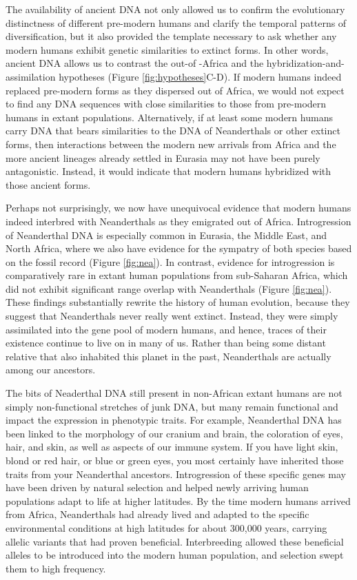 \documentclass[
]{book}
\begin{document}
The availability of ancient DNA not only allowed us to confirm the evolutionary distinctness of different pre-modern humans and clarify the temporal patterns of diversification, but it also provided the template necessary to ask whether any modern humans exhibit genetic similarities to extinct forms. In other words, ancient DNA allows us to contrast the out-of -Africa and the hybridization-and-assimilation hypotheses (Figure \ref{fig:hypotheses}C-D). If modern humans indeed replaced pre-modern forms as they dispersed out of Africa, we would not expect to find any DNA sequences with close similarities to those from pre-modern humans in extant populations. Alternatively, if at least some modern humans carry DNA that bears similarities to the DNA of Neanderthals or other extinct forms, then interactions between the modern new arrivals from Africa and the more ancient lineages already settled in Eurasia may not have been purely antagonistic. Instead, it would indicate that modern humans hybridized with those ancient forms.

Perhaps not surprisingly, we now have unequivocal evidence that modern humans indeed interbred with Neanderthals as they emigrated out of Africa. Introgression of Neanderthal DNA is especially common in Eurasia, the Middle East, and North Africa, where we also have evidence for the sympatry of both species based on the fossil record (Figure \ref{fig:nea}). In contrast, evidence for introgression is comparatively rare in extant human populations from sub-Saharan Africa, which did not exhibit significant range overlap with Neanderthals (Figure \ref{fig:nea}). These findings substantially rewrite the history of human evolution, because they suggest that Neanderthals never really went extinct. Instead, they were simply assimilated into the gene pool of modern humans, and hence, traces of their existence continue to live on in many of us. Rather than being some distant relative that also inhabited this planet in the past, Neanderthals are actually among our ancestors.

The bits of Neaderthal DNA still present in non-African extant humans are not simply non-functional stretches of junk DNA, but many remain functional and impact the expression in phenotypic traits. For example, Neanderthal DNA has been linked to the morphology of our cranium and brain, the coloration of eyes, hair, and skin, as well as aspects of our immune system. If you have light skin, blond or red hair, or blue or green eyes, you most certainly have inherited those traits from your Neanderthal ancestors. Introgression of these specific genes may have been driven by natural selection and helped newly arriving human populations adapt to life at higher latitudes. By the time modern humans arrived from Africa, Neanderthals had already lived and adapted to the specific environmental conditions at high latitudes for about 300,000 years, carrying allelic variants that had proven beneficial. Interbreeding allowed these beneficial alleles to be introduced into the modern human population, and selection swept them to high frequency.
\end{document}

